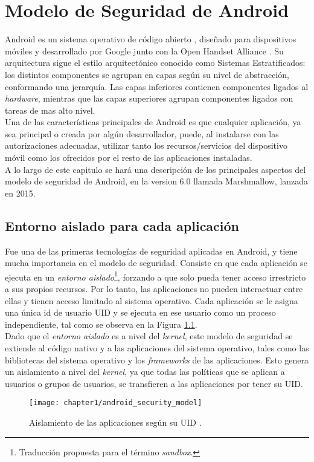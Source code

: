\chapter{Modelo de Seguridad de Android}
Android \cite{aos} es un sistema operativo de código abierto \cite{aosp}, diseñado para dispositivos móviles y
desarrollado por Google junto con la Open Handset Alliance \cite{oha}. Su arquitectura sigue el estilo arquitectónico conocido como Sistemas Estratificados: los distintos componentes se agrupan en capas según su nivel de abstracción, conformando una jerarquía. Las capas inferiores contienen componentes ligados al \textit{hardware}, mientras que las capas superiores agrupan componentes ligados con tareas de mas alto nivel.\\

Una de las características principales de Android es que cualquier aplicación, ya sea principal o
creada por algún desarrollador, puede, al instalarse con las autorizaciones adecuadas, utilizar tanto
los recursos/servicios del dispositivo móvil como los ofrecidos por el resto de las aplicaciones
instaladas.\\

A lo largo de este capitulo se hará una descripción de los principales aspectos del modelo de seguridad de Android,  en la version 6.0 llamada Marshmallow, lanzada en 2015.
\section{Entorno aislado para cada aplicación}\label{ch01-sandbox}
Fue una de las primeras tecnologías de seguridad aplicadas en Android, y tiene mucha importancia en el modelo de seguridad. Consiste en que cada aplicación se ejecuta en un \emph{entorno aislado}\footnote{Traducción propuesta para el término \textit{sandbox}.}, forzando a que solo pueda tener acceso irrestricto a sus propios recursos. Por lo tanto, las aplicaciones no pueden interactuar entre ellas y tienen acceso limitado al sistema operativo. Cada aplicación se le asigna una única id de usuario UID y se ejecuta en ese usuario como un proceso independiente, tal como se observa en la Figura \ref{fig:ch01:sandbox}.\\

Dado que el \emph{entorno aislado} es a nivel del \textit{kernel}, este modelo de seguridad se extiende al código nativo y a las aplicaciones del sistema operativo, tales como las bibliotecas del sistema operativo y los \textit{frameworks} de las aplicaciones. Esto genera un aislamiento a nivel del \textit{kernel}, ya que todas las políticas que se aplican a usuarios o grupos de usuarios, se transfieren a las aplicaciones por tener su UID.
\begin{figure}[hbtp]
	\begin{center}
		\texttt{[image: chapter1/android\_security\_model]}
	    \caption{Aislamiento de las aplicaciones según su UID \cite{asreview2015}.}
	    \label{fig:ch01:sandbox}
    \end{center}
\end{figure}

